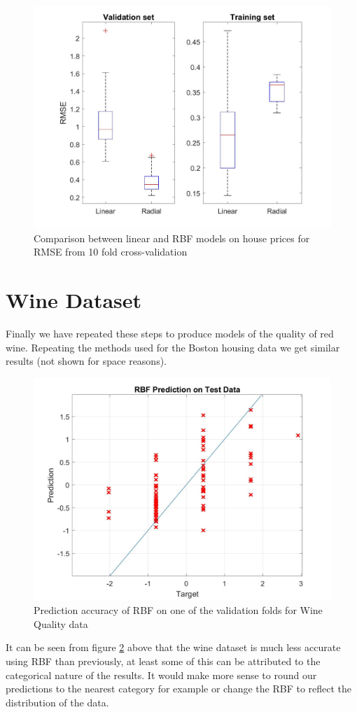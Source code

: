 \documentclass[a4paper,10pt, twocolumn]{article}
\begin{document}
\begin{figure}[ht]
	\includegraphics[width=0.7\linewidth]{linearComparison.jpg}
	\centering
	\caption{Comparison between linear and RBF models on house prices for RMSE from 10 fold cross-validation}
		\label{fig:linearComparison}
\end{figure}

\section{Wine Dataset\cite{wineQuality}}

Finally we have repeated these steps to produce models of the quality of red wine. Repeating the methods used for the Boston housing data we get similar results (not shown for space reasons). 

\begin{figure}[ht]
	\includegraphics[width=0.7\linewidth]{wineResults.jpg}
	\centering
	\caption{Prediction accuracy of RBF on one of the validation folds for Wine Quality data}
		\label{fig:WineResults}
\end{figure}

It can be seen from figure \ref{fig:WineResults} above that the wine dataset is much less accurate using RBF than previously, at least some of this can be attributed to the categorical nature of the results. It would make more sense to round our predictions to the nearest category for example or change the RBF to reflect the distribution of the data. 
\end{document}
